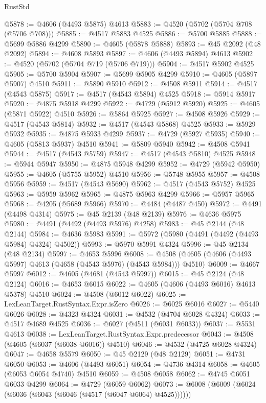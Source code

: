 \begin{lexlean}{RustStd}
\begin{coremodule}
@5878 := @4606 (@4493 @5875) @4613
@5883 := @4520 (@5702 (@5704 @708 (@5706 @708)))
@5885 := @4517 @5883 @4525
@5886 := @5700 @5885
@5888 := @5699 @5886 @4299
@5890 := @4605 (@5878 @5888)
@5893 := @45 @2092 (@48 @2092)
@5894 := @4608 @5893
@5897 := @4606 (@4493 @5894) @4613
@5902 := @4520 (@5702 (@5704 @719 (@5706 @719)))
@5904 := @4517 @5902 @4525
@5905 := @5700 @5904
@5907 := @5699 @5905 @4299
@5910 := @4605 (@5897 @5907) @4510
@5911 := @5890 @5910
@5912 := @4508 @5911
@5914 := @4517 (@4543 @5875)
@5917 := @4517 (@4543 @5894) @4525
@5918 := @5914 @5917
@5920 := @4875 @5918 @4299
@5922 := @4729 (@5912 @5920)
@5925 := @4605 (@5871 @5922) @4510
@5926 := @5864 @5925
@5927 := @4508 @5926
@5929 := @4517 (@4543 @5814)
@5932 := @4517 (@4543 @5868) @4525
@5933 := @5929 @5932
@5935 := @4875 @5933 @4299
@5937 := @4729 (@5927 @5935)
@5940 := @4605 (@5813 @5937) @4510
@5941 := @5809 @5940
@5942 := @4508 @5941
@5944 := @4517 (@4543 @5759)
@5947 := @4517 (@4543 @5810) @4525
@5948 := @5944 @5947
@5950 := @4875 @5948 @4299
@5952 := @4729 (@5942 @5950)
@5955 := @4605 (@5755 @5952) @4510
@5956 := @5748 @5955
@5957 := @4508 @5956
@5959 := @4517 (@4543 @5690)
@5962 := @4517 (@4543 @5752) @4525
@5963 := @5959 @5962
@5965 := @4875 @5963 @4299
@5966 := @5957 @5965
@5968 := @4205 (@5689 @5966)
@5970 := @4484 (@4487 @450)
@5972 := @4491 (@4498 @4314)
@5975 := @45 @2139 (@48 @2139)
@5976 := @4636 @5975
@5980 := @4491 (@4492 (@4493 @5976) @4258)
@5983 := @45 @2144 (@48 @2144)
@5984 := @4636 @5983
@5991 := @5972 (@5980 (@4491 (@4492 (@4493 @5984) @4324) @4502))
@5993 := @5970 @5991 @4324
@5996 := @45 @2134 (@48 @2134)
@5997 := @4653 @5996
@6008 := @4508 (@4605 (@4606 (@4493 @5997) @4613 (@4658 (@4543 @5976) (@4543 @5984))) @4510)
@6009 := @4667 @5997
@6012 := @4605 (@4681 (@4543 @5997))
@6015 := @45 @2124 (@48 @2124)
@6016 := @4653 @6015
@6022 := @4605 (@4606 (@4493 @6016) @4613 @5378) @4510
@6024 := @4508 (@6012 @6022)
@6025 := LexLeanTarget.RustSyntax.Expr.isZero
@6026 := @6025 @6016
@6027 := @5440 @6026
@6028 := @4323 @4324
@6031 := @4532 (@4704 @6028 @4324)
@6033 := @4517 @4689 @4525
@6036 := @6027 (@4511 (@6031 @6033))
@6037 := @5531 @4613
@6038 := LexLeanTarget.RustSyntax.Expr.predecessor
@6043 := @4508 (@4605 (@6037 (@6038 @6016)) @4510)
@6046 := @4532 (@4725 @6028 @4324)
@6047 := @4658 @5579
@6050 := @45 @2129 (@48 @2129)
@6051 := @4731 @6050
@6053 := @4606 (@4493 @6051)
@6054 := @4736 @4314
@6058 := @4605 (@6053 @6054 @4740) @4510
@6059 := @4508 @6058
@6062 := @4745 @6051 @6033 @4299
@6064 := @4729 (@6059 @6062)
@6073 := @6008 (@6009 (@6024 (@6036 (@6043 (@6046 (@4517 (@6047 @6064) @4525))))))

\end{coremodule}
\end{lexlean}
